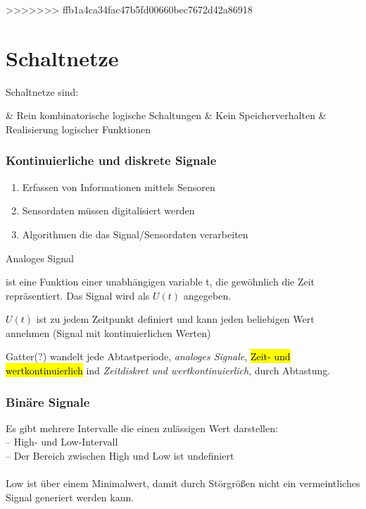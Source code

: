 \documentclass[a4paper]{scrartcl}
\begin{document}
>>>>>>> ffb1a4ca34fac47b5fd00660bec7672d42a86918
	\section{Schaltnetze}
		
			Schaltnetze sind:
			\begin{easylist}
				& Rein kombinatorische logische Schaltungen
				& Kein Speicherverhalten
				& Realisierung logischer Funktionen
			\end{easylist}
		
			\subsubsection{Kontinuierliche und diskrete Signale}
				\begin{enumerate}
					\item Erfassen von Informationen mittels Sensoren
					\item Sensordaten müssen digitalisiert werden
					\item Algorithmen die das Signal/Sensordaten verarbeiten
				\end{enumerate}
			
				\begin{labeling}{Analoges Signal}
					\item[Ein Signal] ist eine Funktion einer unabhängigen variable t, die gewöhnlich die Zeit repräsentiert. Das Signal wird als \(U(t)\) angegeben.
					\item[Analoges Signal] \( U(t) \) ist zu jedem Zeitpunkt definiert und kann jeden beliebigen Wert annehmen (Signal mit kontinuierlichen Werten)
				\end{labeling}
				
				Gatter(?) wandelt jede Abtastperiode, \emph{analoges Signale}, \hl{Zeit- und wertkontinuierlich} ind \emph{Zeitdiskret und wertkontinuierlich}, durch Abtastung.\\
			
			\subsubsection{Binäre Signale}
				Es gibt mehrere Intervalle die einen zulässigen Wert darstellen:\\
				-- High- und Low-Intervall\\
				-- Der Bereich zwischen High und Low ist undefiniert\\
				\\
				Low ist über einem Minimalwert, damit durch Störgrößen nicht ein vermeintliches Signal generiert werden kann.
				
\end{document}
